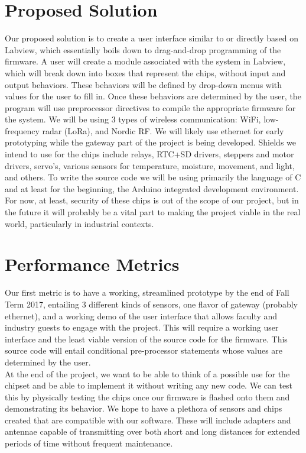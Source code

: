 \documentclass[onecolumn, draftclsnofoot,10pt, compsoc]{IEEEtran}
\begin{document}
\section{Proposed Solution}
Our proposed solution is to create a user interface similar to or directly based on Labview, which essentially boils down to drag-and-drop programming of the firmware.
A user will create a module associated with the system in Labview, which will break down into boxes that represent the chips, without input and output behaviors.
These behaviors will be defined by drop-down menus with values for the user to fill in.
Once these behaviors are determined by the user, the program will use preprocessor directives to compile the appropriate firmware for the system.
We will be using 3 types of wireless communication: WiFi, low-frequency radar (LoRa), and Nordic RF.
We will likely use ethernet for early prototyping while the gateway part of the project is being developed.
Shields we intend to use for the chips include relays, RTC+SD drivers, steppers and motor drivers, servo's, various sensors for temperature, moisture, movement, and light, and others.
To write the source code we will be using primarily the language of C and at least for the beginning, the Arduino integrated development environment.
For now, at least, security of these chips is out of the scope of our project, but in the future it will probably be a vital part to making the project viable in the real world, particularly in industrial contexts.

\section{Performance Metrics}
Our first metric is to have a working, streamlined prototype by the end of Fall Term 2017, entailing 3 different kinds of sensors, one flavor of gateway (probably ethernet), and a working demo of the user interface that allows faculty and industry guests to engage with the project.
This will require a working user interface and the least viable version of the source code for the firmware.
This source code will entail conditional pre-processor statements whose values are determined by the user. \\
At the end of the project, we want to be able to think of a possible use for the chipset and be able to implement it without writing any new code.
We can test this by physically testing the chips once our firmware is flashed onto them and demonstrating its behavior.
We hope to have a plethora of sensors and chips created that are compatible with our software.
These will include adapters and antennae capable of transmitting over both short and long distances for extended periods of time without frequent maintenance.
\end{document}
